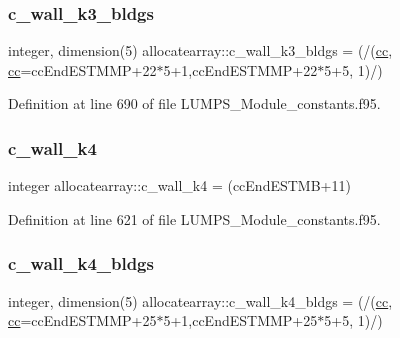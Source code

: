\subsubsection{\texorpdfstring{c\+\_\+wall\+\_\+k3\+\_\+bldgs}{c\_wall\_k3\_bldgs}}
{\footnotesize\ttfamily integer, dimension(5) allocatearray\+::c\+\_\+wall\+\_\+k3\+\_\+bldgs = (/(\hyperlink{namespaceallocatearray_ac863c81704eb507dee10f5e10741e10c}{cc}, \hyperlink{namespaceallocatearray_ac863c81704eb507dee10f5e10741e10c}{cc}=cc\+End\+E\+S\+T\+M\+MP+22$\ast$5+1,cc\+End\+E\+S\+T\+M\+MP+22$\ast$5+5, 1)/)}



Definition at line 690 of file L\+U\+M\+P\+S\+\_\+\+Module\+\_\+constants.\+f95.

\mbox{\label{namespaceallocatearray_ae4f8b8b11060d80676b09002f11a32fe}} 
\subsubsection{\texorpdfstring{c\+\_\+wall\+\_\+k4}{c\_wall\_k4}}
{\footnotesize\ttfamily integer allocatearray\+::c\+\_\+wall\+\_\+k4 = (cc\+End\+E\+S\+T\+MB+11)}



Definition at line 621 of file L\+U\+M\+P\+S\+\_\+\+Module\+\_\+constants.\+f95.

\mbox{\label{namespaceallocatearray_ae9a73533916e4cc62f3cec0c85f0d985}} 
\subsubsection{\texorpdfstring{c\+\_\+wall\+\_\+k4\+\_\+bldgs}{c\_wall\_k4\_bldgs}}
{\footnotesize\ttfamily integer, dimension(5) allocatearray\+::c\+\_\+wall\+\_\+k4\+\_\+bldgs = (/(\hyperlink{namespaceallocatearray_ac863c81704eb507dee10f5e10741e10c}{cc}, \hyperlink{namespaceallocatearray_ac863c81704eb507dee10f5e10741e10c}{cc}=cc\+End\+E\+S\+T\+M\+MP+25$\ast$5+1,cc\+End\+E\+S\+T\+M\+MP+25$\ast$5+5, 1)/)}



